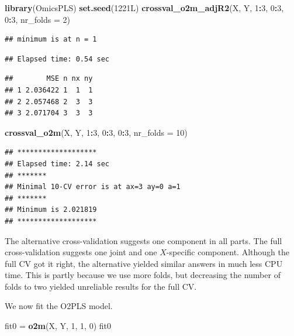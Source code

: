 \documentclass[]{article}
\newenvironment{Shaded}{\begin{snugshade}}{\end{snugshade}}
\newcommand{\DataTypeTok}[1]{\textcolor[rgb]{0.13,0.29,0.53}{#1}}
\newcommand{\DecValTok}[1]{\textcolor[rgb]{0.00,0.00,0.81}{#1}}
\newcommand{\KeywordTok}[1]{\textcolor[rgb]{0.13,0.29,0.53}{\textbf{#1}}}
\newcommand{\NormalTok}[1]{#1}
\newcommand{\OperatorTok}[1]{\textcolor[rgb]{0.81,0.36,0.00}{\textbf{#1}}}
\newcommand{\StringTok}[1]{\textcolor[rgb]{0.31,0.60,0.02}{#1}}
\begin{document}
\begin{Shaded}
\begin{Highlighting}[]
\KeywordTok{library}\NormalTok{(OmicsPLS)}
\KeywordTok{set.seed}\NormalTok{(1221L)}
\KeywordTok{crossval_o2m_adjR2}\NormalTok{(X, Y, }\DecValTok{1}\OperatorTok{:}\DecValTok{3}\NormalTok{, }\DecValTok{0}\OperatorTok{:}\DecValTok{3}\NormalTok{, }\DecValTok{0}\OperatorTok{:}\DecValTok{3}\NormalTok{, }\DataTypeTok{nr_folds =} \DecValTok{2}\NormalTok{)}
\end{Highlighting}
\end{Shaded}

\begin{verbatim}
## minimum is at n = 1
\end{verbatim}

\begin{verbatim}
## Elapsed time: 0.54 sec
\end{verbatim}

\begin{verbatim}
##        MSE n nx ny
## 1 2.036422 1  1  1
## 2 2.057468 2  3  3
## 3 2.071704 3  3  3
\end{verbatim}

\begin{Shaded}
\begin{Highlighting}[]
\KeywordTok{crossval_o2m}\NormalTok{(X, Y, }\DecValTok{1}\OperatorTok{:}\DecValTok{3}\NormalTok{, }\DecValTok{0}\OperatorTok{:}\DecValTok{3}\NormalTok{, }\DecValTok{0}\OperatorTok{:}\DecValTok{3}\NormalTok{, }\DataTypeTok{nr_folds =} \DecValTok{10}\NormalTok{)}
\end{Highlighting}
\end{Shaded}

\begin{verbatim}
## *******************
## Elapsed time: 2.14 sec
## *******
## Minimal 10-CV error is at ax=3 ay=0 a=1 
## *******
## Minimum is 2.021819 
## *******************
\end{verbatim}

The alternative cross-validation suggests one component in all parts.
The full cross-validation suggests one joint and one \(X\)-specific
component. Although the full CV got it right, the alternative yielded
similar answers in much less CPU time. This is partly because we use
more folds, but decreasing the number of folds to two yielded unreliable
results for the full CV.

We now fit the O2PLS model.

\begin{Shaded}
\begin{Highlighting}[]
\NormalTok{fit0 =}\StringTok{ }\KeywordTok{o2m}\NormalTok{(X, Y, }\DecValTok{1}\NormalTok{, }\DecValTok{1}\NormalTok{, }\DecValTok{0}\NormalTok{)}
\NormalTok{fit0}
\end{Highlighting}
\end{Shaded}
\end{document}
